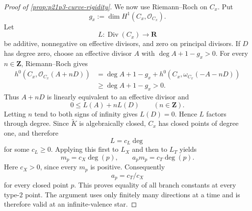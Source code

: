 \begin{proof}[Proof of \cref{prop:p21p3-curve-rigidity}]
We now use Riemann--Roch on \(C_x\).  Put
\[
                  g_x:=\dim H^1(C_x,\mathcal O_{C_x}).
\]
Let
\[
                         L:\operatorname{Div}(C_x)\longrightarrow\mathbf R
\]
be additive, nonnegative on effective divisors, and zero on principal
divisors.  If \(D\) has degree zero, choose an effective divisor \(A\)
with
\(\deg A+1-g_x>0\).  For every \(n\in\mathbf Z\), Riemann--Roch gives
\[
 \begin{split}
 h^0(C_x,\mathcal O_{C_x}(A+nD))
 &=\deg A+1-g_x
   +h^0(C_x,\omega_{C_x}(-A-nD))\\
 &\geq \deg A+1-g_x>0.
 \end{split}
\]
Thus \(A+nD\) is linearly equivalent to an effective divisor and
\[
                         0\leq L(A)+nL(D)
                         \qquad(n\in\mathbf Z).
\]
Letting \(n\) tend to both signs of infinity gives \(L(D)=0\).  Hence
\(L\) factors through degree.  Since \(\widetilde K\) is algebraically
closed, \(C_x\) has closed points of degree one, and therefore
\begin{equation}
\label{eq:p21p3-degree-classification}
                         L=c_L\deg
\end{equation}
for some \(c_L\geq0\).  Applying this first to \(L_X\) and then to
\(L_T\) yields
\[
                  m_p=c_X\deg(p),\qquad
                  a_pm_p=c_T\deg(p).
\]
Here \(c_X>0\), since every \(m_p\) is positive.  Consequently
\begin{equation}
\label{eq:p21p3-equal-star-ratios}
                              a_p=c_T/c_X
\end{equation}
for every closed point \(p\).  This proves equality of all branch
constants at every
type-$2$ point.  The argument uses only finitely many directions at a
time and is therefore valid at an infinite-valence star.


\end{proof}

